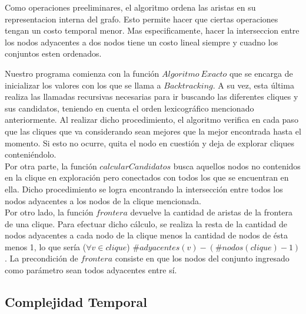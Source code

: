 Como operaciones preeliminares, el algoritmo ordena las aristas en su representacion interna del grafo. Esto permite hacer que ciertas operaciones tengan un costo temporal menor. Mas especificamente, hacer la interseccion entre los nodos adyacentes a dos nodos tiene un costo lineal siempre y cuadno los conjuntos esten ordenados.

Nuestro programa comienza con la función $Algoritmo\ Exacto$ que se encarga de inicializar los valores con los que se llama a $Backtracking$. A su vez, esta última realiza las llamadas recursivas necesarias para ir buscando las diferentes cliques y sus candidatos, teniendo en cuenta el orden lexicográfico mencionado anteriormente. Al realizar dicho procedimiento, el algoritmo verifica en cada paso que las cliques que va considerando sean mejores que la mejor encontrada hasta el momento. Si esto no ocurre, quita el nodo en cuestión y deja de explorar cliques conteniéndolo.\\
\newline
Por otra parte, la función $calcularCandidatos$ busca aquellos nodos no contenidos en la clique en exploración pero conectados con todos los que se encuentran en ella. Dicho procedimiento se logra encontrando la intersección entre todos los nodos adyacentes a los nodos de la clique mencionada.\\
\newline
Por otro lado, la función $frontera$ devuelve la cantidad de aristas de la frontera de una clique. Para efectuar dicho cálculo, se realiza la resta de la cantidad de nodos adyacentes a cada nodo de la clique menos la cantidad de nodos de ésta menos 1, lo que sería ($\forall v \in clique$) $\#adyacentes(v)-(\#nodos(clique)-1)$. La precondición de $frontera$ consiste en que los nodos del conjunto ingresado como parámetro sean todos adyacentes entre sí.

\subsection{Complejidad Temporal}

